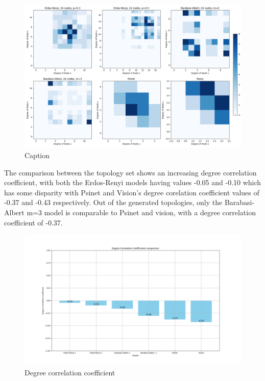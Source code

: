 \begin{figure}
    \centering
    \includegraphics[width=0.9\linewidth]{images/FINAL-TOPO-COMP/Degree-correlation-matrices/24-matrix.png}
    \caption{Caption}
    \label{fig:enter-label}
\end{figure}

The comparison between the topology set shows an increasing degree correlation coefficient, with both the Erdos-Renyi models having values -0.05 and -0.10 which has some disparity with Psinet and Vision's degree corelation coefficient values of -0.37 and -0.43 respectively. Out of the generated topologies, only the Barabasi-Albert m=3 model is comparable to Psinet and vision, with a degree correlation coefficient of -0.37. 
\begin{figure}
    \centering
    \includegraphics[width=0.9\linewidth]{images/FINAL-TOPO-COMP/Degree-correlation-coeff/deg-coeff-24.png}
    \caption{Degree correlation coefficient}
    \label{fig:enter-label}
\end{figure}

